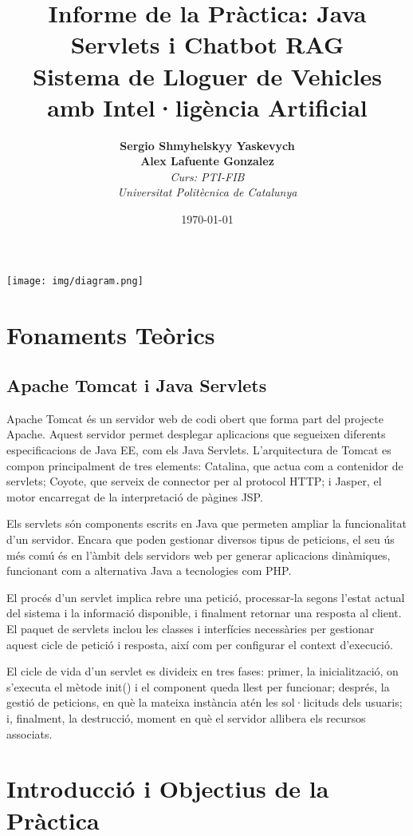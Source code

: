 \documentclass[12pt,a4paper]{article}
\title{\textbf{Informe de la Pràctica: Java Servlets i Chatbot RAG}\\
Sistema de Lloguer de Vehicles amb Intel·ligència Artificial}
\author{\textbf{Sergio Shmyhelskyy Yaskevych}\\
\textbf{Alex Lafuente Gonzalez}\\
\textit{Curs: PTI-FIB}\\
\textit{Universitat Politècnica de Catalunya}}
\date{\today}
\begin{document}
\maketitle
\thispagestyle{empty}

\vfill
\begin{center}
\texttt{[image: img/diagram.png]}
\end{center}
\vfill

\newpage
\tableofcontents
\newpage

\section{Fonaments Teòrics}

\subsection{Apache Tomcat i Java Servlets}

Apache Tomcat és un servidor web de codi obert que forma part del projecte Apache. 
Aquest servidor permet desplegar aplicacions que segueixen diferents especificacions de Java EE, com els Java Servlets.
 L’arquitectura de Tomcat es compon principalment de tres elements: Catalina, que actua com a contenidor de servlets; 
 Coyote, que serveix de connector per al protocol HTTP; i Jasper, el motor encarregat de la interpretació de pàgines JSP.

Els servlets són components escrits en Java que permeten ampliar la funcionalitat d’un servidor. 
Encara que poden gestionar diversos tipus de peticions, el seu ús més comú és en l’àmbit dels servidors web 
per generar aplicacions dinàmiques, funcionant com a alternativa Java a tecnologies com PHP.

El procés d’un servlet implica rebre una petició, processar-la segons l’estat actual del sistema i la informació disponible, 
i finalment retornar una resposta al client. El paquet de servlets inclou les classes i interfícies necessàries per gestionar
 aquest cicle de petició i resposta, així com per configurar el context d’execució.

El cicle de vida d’un servlet es divideix en tres fases: primer, la inicialització, on s’executa el mètode init() i el 
component queda llest per funcionar; després, la gestió de peticions, en què la mateixa instància atén les sol·licituds 
dels usuaris; i, finalment, la destrucció, moment en què el servidor allibera els recursos associats.

\section{Introducció i Objectius de la Pràctica}
\end{document}
